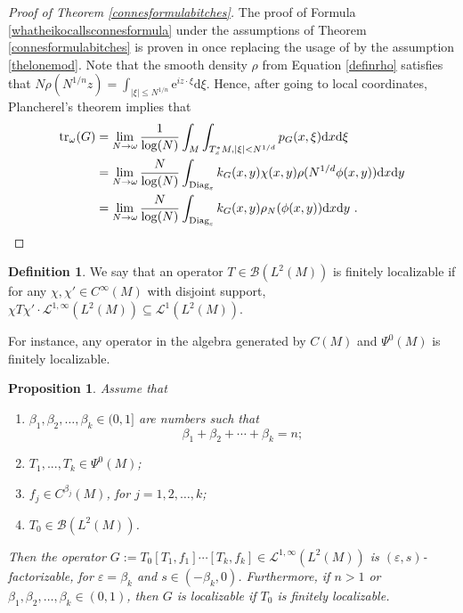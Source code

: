 \documentclass[10pt]{amsart}
\newtheorem{prop}[thm]{Proposition}
\theoremstyle{remark}
\theoremstyle{definition}
\newtheorem{deef}[thm]{Definition}
\begin{document}
\begin{proof}[Proof of Theorem \ref{connesformulabitches}]
The proof of Formula \eqref{whatheikocallsconnesformula} under the assumptions of Theorem \ref{connesformulabitches} is proven in \cite[Chapter 11.6]{sukolord} once replacing the usage of \cite[Proposition 11.3.18]{sukolord} by the assumption \eqref{thelonemod}. Note that the smooth density $\rho$ from Equation \eqref{definrho} satisfies that $N\rho(N^{1/n}z)=\int_{|\xi|\leq N^{1/n}} {\mathrm{e}}^{iz\cdot \xi}{\mathrm{d}} \xi$. Hence, after going to local coordinates, Plancherel's theorem implies that 
\begin{align*}
{\mathrm{t}\mathrm{r}}_\omega(G)&=\lim_{N\to \omega}\frac{1}{\log(N)} \int_M\int_{T^*_xM, |\xi|<N^{1/d}} p_G(x,\xi){\mathrm{d}} x{\mathrm{d}} \xi\\
&=\lim_{N\to \omega}\frac{N}{\log(N)}\int_{\textnormal{Diag}_{\varepsilon}} k_G(x,y)\chi(x,y)\rho(N^{1/d}\phi(x,y)){\mathrm{d}} x{\mathrm{d}} y\\
&=\lim_{N\to \omega}\frac{N}{\log(N)}\int_{\textnormal{Diag}_{\varepsilon}} k_G(x,y)\rho_N(\phi(x,y)){\mathrm{d}} x{\mathrm{d}} y\ .
\end{align*}
\end{proof}

\begin{deef}
We say that an operator $T\in {\mathcal{B}}(L^2(M))$ is finitely localizable if for any $\chi,\chi'\in C^\infty(M)$ with disjoint support, $\chi T\chi'\cdot \mathcal{L}^{1,\infty}(L^2(M))\subseteq \mathcal{L}^1(L^2(M))$. 
\end{deef}

For instance, any operator in the algebra generated by $C(M)$ and $\Psi^0(M)$ is finitely localizable.

\begin{prop}
\label{prodofcomm}
Assume that
\begin{enumerate}
\item $\beta_1,\beta_2,\ldots, \beta_k\in (0,1]$ are numbers such that
$$\beta_1+\beta_2+\cdots +\beta_k=n;$$
\item $T_1,..., T_k\in \Psi^0(M)$;
\item $f_j\in C^{\beta_j}(M)$, for $j=1,2,\ldots, k$;
\item $T_0\in {\mathcal{B}}(L^2(M))$.
\end{enumerate}
Then the operator $G:=T_0[T_1,f_1]\cdots [T_k,f_k]\in \mathcal{L}^{1,\infty}(L^2(M))$ is $({\varepsilon},s)$-factorizable, for ${\varepsilon}=\beta_k$ and $s\in (-\beta_k,0)$. Furthermore, if $n>1$ or $\beta_1,\beta_2,\ldots, \beta_k\in (0,1)$, then $G$ is localizable if $T_0$ is finitely localizable.
\end{prop}
\end{document}
